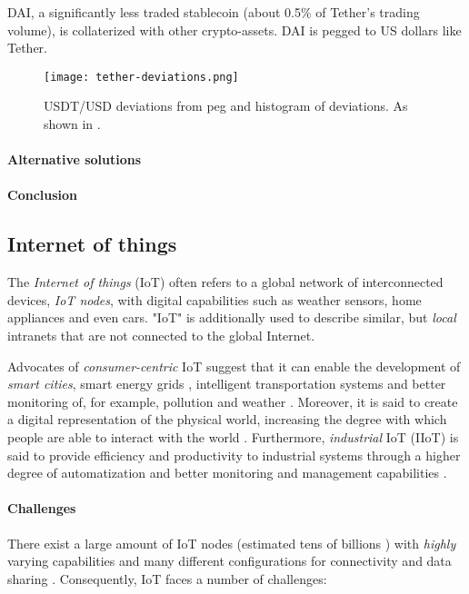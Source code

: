 DAI, a significantly less traded stablecoin (about 0.5\% of Tether's
trading volume), is collaterized with other crypto-assets. DAI is
pegged to US dollars like Tether.




\begin{figure}
  \texttt{[image: tether-deviations.png]}
  \caption{USDT/USD deviations from peg and histogram of deviations.
  As shown in \cite{lyonsStable}.}
  \label{fig:tether-deviations}
\end{figure}

\paragraph{Alternative solutions}

\paragraph{Conclusion}

\subsection{Internet of things}

The \textit{Internet of things} (IoT) often refers to a global network
of interconnected devices, \textit{IoT nodes}, with digital capabilities such
as weather sensors, home appliances and even cars. "IoT" is additionally
used to describe similar, but \textit{local} intranets that are not
connected to the global Internet. 

Advocates of \textit{consumer-centric} IoT suggest that it can enable
the development of \textit{smart cities}, smart energy grids
\cite{reynaIntegration}, intelligent transportation systems and better
monitoring of, for example, pollution and weather
\cite{sisinniIndustrial}. Moreover, it is said to create a digital
representation of the physical world, increasing the degree with which
people are able to interact with the world
\cite{reynaIntegration,viriyasitavatIot}. Furthermore,
\textit{industrial} IoT (IIoT) is said to provide efficiency and
productivity to industrial systems through a higher degree of
automatization and better monitoring and management capabilities
\cite{coleBlockchain,sisinniIndustrial}.


\paragraph{Challenges} There exist a large amount of IoT nodes
(estimated tens of billions \cite{reynaIntegration}) with
\textit{highly} varying capabilities and many different configurations
for connectivity and data sharing \cite{sisinniIndustrial}.
Consequently, IoT faces a number of challenges:


